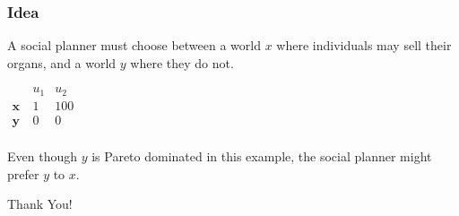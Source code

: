 \documentclass{beamer}
\begin{document}
\begin{frame}
	\frametitle{Idea}
	A social planner must choose between a world $x$ where individuals may sell their organs, and a world $y$ where they do not.
	\begin{center}
		$
		\begin{array}{ccc}
		& u_1 & u_2 \\
		\mathbf{x} \ & 1 & 100 \\
		\mathbf{y} \ & 0 & 0 \\
		\end{array}
		$
	\end{center}
	Even though $y$ is Pareto dominated in this example, the social planner might prefer $y$ to $x$. 
\end{frame}


\addtocounter{framenumber}{-1}
\begin{frame}[plain]
	\centering \color{darkred}\LARGE Thank You!
\end{frame}




\scriptsize{ }
\end{document}
